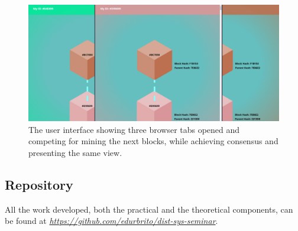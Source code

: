 \documentclass[journal]{IEEEtran}
\begin{document}
\begin{figure}[h]
  \centering
  \includegraphics[width=\columnwidth]{in-browser-pow}
  \caption{The user interface showing three browser tabs opened and competing for mining the next blocks, 
  while achieving consensus and presenting the same view.}
  \label{fig:in-browser-pow}
\end{figure}

\subsection{Repository}

All the work developed, both the practical and the theoretical components, can be found 
at \emph{\url{https://github.com/edurbrito/dist-sys-seminar}}.

\end{document}
